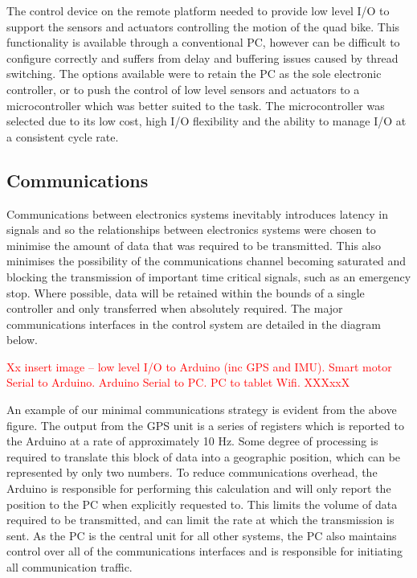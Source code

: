\documentclass[main.tex]{subfiles}
\begin{document}
The control device on the remote platform needed to provide low level I/O to support the sensors and actuators controlling the motion of the quad bike. This functionality is available through a conventional PC, however can be difficult to configure correctly and suffers from delay and buffering issues caused by thread switching. The options available were to retain the PC as the sole electronic controller, or to push the control of low level sensors and actuators to a microcontroller which was better suited to the task. The microcontroller was selected due to its low cost, high I/O flexibility and the ability to manage I/O at a consistent cycle rate. 


\subsection{Communications}
Communications between electronics systems inevitably introduces latency in signals and so the relationships between electronics systems were chosen to minimise the amount of data that was required to be transmitted. This also minimises the possibility of the communications channel becoming saturated and blocking the transmission of important time critical signals, such as an emergency stop. Where possible, data will be retained within the bounds of a single controller and only transferred when absolutely required. The major communications interfaces in the control system are detailed in the diagram below.

\textcolor{red}{Xx insert image – low level I/O to Arduino (inc GPS and IMU). Smart motor Serial to Arduino. Arduino Serial to PC. PC to tablet Wifi. XXXxxX}

An example of our minimal communications strategy is evident from the above figure. The output from the GPS unit is a series of registers which is reported to the Arduino at a rate of approximately 10 Hz. Some degree of processing is required to translate this block of data into a geographic position, which can be represented by only two numbers. To reduce communications overhead, the Arduino is responsible for performing this calculation and will only report the position to the PC when explicitly requested to. This limits the volume of data required to be transmitted, and can limit the rate at which the transmission is sent. As the PC is the central unit for all other systems, the PC also maintains control over all of the communications interfaces and is responsible for initiating all communication traffic.
\end{document}
